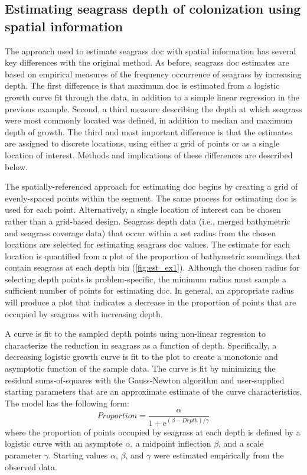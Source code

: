 \documentclass[letterpaper,12pt,oneside]{article}\usepackage[]{graphicx}\usepackage[]{color}
\begin{document}
\subsection{Estimating seagrass depth of colonization using spatial information}

The approach used to estimate seagrass \ac{doc} with spatial information has several key differences with the original method.  As before, seagrass \ac{doc} estimates are based on empirical measures of the frequency occurrence of seagrass by increasing depth.  The first difference is that maximum \ac{doc} is estimated from a logistic growth curve fit through the data, in addition to a simple linear regression in the previous example.  Second, a third measure describing the depth at which seagrass were most commonly located was defined, in addition to median and maximum depth of growth.  The third and most important difference is that the estimates are assigned to discrete locations, using either a grid of points or as a single location of interest. Methods and implications of these differences are described below.                                   

The spatially-referenced approach for estimating \ac{doc} begins by creating a grid of evenly-spaced points within the segment.  The same process for estimating \ac{doc} is used for each point.  Alternatively, a single location of interest can be chosen rather than a grid-based design.  Seagrass depth data (i.e., merged bathymetric and seagrass coverage data) that occur within a set radius from the chosen locations are selected for estimating seagrass \ac{doc} values. The estimate for each location is quantified from a plot of the proportion of bathymetric soundings that contain seagrass at each depth bin (\cref{fig:est_ex1}).  Although the chosen radius for selecting depth points is problem-specific, the minimum radius must sample a sufficient number of points for estimating \ac{doc}.  In general, an appropriate radius will produce a plot that indicates a decrease in the proportion of points that are occupied by seagrass with increasing depth.  

A curve is fit to the sampled depth points using non-linear regression to characterize the reduction in seagrass as a function of depth.  Specifically, a decreasing logistic growth curve is fit to the plot to create a monotonic and asymptotic function of the sample data.   The curve is fit by minimizing the residual sums-of-squares with the Gauss-Newton algorithm \citep{Bates92} and user-supplied starting parameters that are an approximate estimate of the curve characteristics.  The model has the following form:
\begin{equation} \label{eqn:prop}
 Proportion = \frac{\alpha}{1 + \mathrm{e}^{{\left(\beta - Depth\right)/\gamma}}}
\end{equation}
where the proportion of points occupied by seagrass at each depth is defined by a logistic curve with an asymptote $\alpha$, a midpoint inflection $\beta$, and a scale parameter $\gamma$.  Starting values $\alpha$, $\beta$, and $\gamma$ were estimated empirically from the observed data.  
\end{document}
